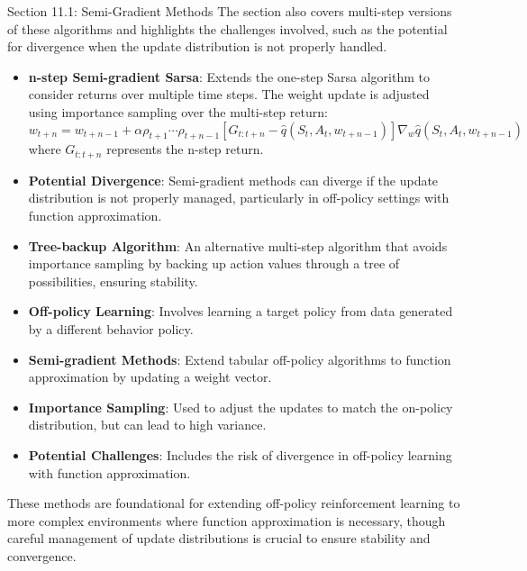 \begin{notes}{Section 11.1: Semi-Gradient Methods}
    The section also covers multi-step versions of these algorithms and highlights the challenges involved, such as the potential for divergence when the update distribution is not properly handled.
    
    \begin{highlight}
    
        \begin{itemize}
            \item \textbf{n-step Semi-gradient Sarsa}: Extends the one-step Sarsa algorithm to consider returns over multiple time steps. The weight update is adjusted using importance sampling over 
            the multi-step return:
            \[
            w_{t+n} = w_{t+n-1} + \alpha \rho_{t+1} \cdots \rho_{t+n-1} [G_{t:t+n} - \hat{q}(S_t, A_t, w_{t+n-1})] \nabla_w \hat{q}(S_t, A_t, w_{t+n-1})
            \]
            where $G_{t:t+n}$ represents the n-step return.
            \item \textbf{Potential Divergence}: Semi-gradient methods can diverge if the update distribution is not properly managed, particularly in off-policy settings with function approximation.
            \item \textbf{Tree-backup Algorithm}: An alternative multi-step algorithm that avoids importance sampling by backing up action values through a tree of possibilities, ensuring stability.
        \end{itemize}
    
    \end{highlight}
    
    \begin{highlight}
    
        \begin{itemize}
            \item \textbf{Off-policy Learning}: Involves learning a target policy from data generated by a different behavior policy.
            \item \textbf{Semi-gradient Methods}: Extend tabular off-policy algorithms to function approximation by updating a weight vector.
            \item \textbf{Importance Sampling}: Used to adjust the updates to match the on-policy distribution, but can lead to high variance.
            \item \textbf{Potential Challenges}: Includes the risk of divergence in off-policy learning with function approximation.
        \end{itemize}
    
        These methods are foundational for extending off-policy reinforcement learning to more complex environments where function approximation is necessary, though careful management of update 
        distributions is crucial to ensure stability and convergence.
    
    \end{highlight}
\end{notes}

